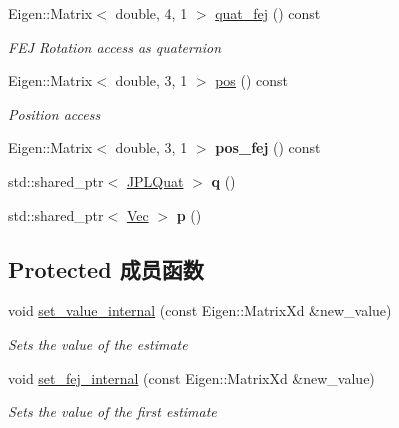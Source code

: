 \begin{DoxyCompactItemize}
\mbox{\label{classov__type_1_1PoseJPL_aa1bb71fdf85190373629e8a2ac818205}} 
Eigen\+::\+Matrix$<$ double, 4, 1 $>$ \hyperlink{classov__type_1_1PoseJPL_aa1bb71fdf85190373629e8a2ac818205}{quat\+\_\+fej} () const
\begin{DoxyCompactList}\small\item\em F\+EJ Rotation access as quaternion \end{DoxyCompactList}\item 
\mbox{\label{classov__type_1_1PoseJPL_ae1f0b41d18b5307e9d035d05abf91c68}} 
Eigen\+::\+Matrix$<$ double, 3, 1 $>$ \hyperlink{classov__type_1_1PoseJPL_ae1f0b41d18b5307e9d035d05abf91c68}{pos} () const
\begin{DoxyCompactList}\small\item\em Position access \end{DoxyCompactList}\item 
\mbox{\label{classov__type_1_1PoseJPL_a6cdf8ee3cfefe564eb01e4b9367a04f6}} 
Eigen\+::\+Matrix$<$ double, 3, 1 $>$ {\bfseries pos\+\_\+fej} () const
\item 
\mbox{\label{classov__type_1_1PoseJPL_a2e6896246cfdba377cd75444f44a8868}} 
std\+::shared\+\_\+ptr$<$ \hyperlink{classov__type_1_1JPLQuat}{J\+P\+L\+Quat} $>$ {\bfseries q} ()
\item 
\mbox{\label{classov__type_1_1PoseJPL_a428675563a664d2f1e3adf333762a022}} 
std\+::shared\+\_\+ptr$<$ \hyperlink{classov__type_1_1Vec}{Vec} $>$ {\bfseries p} ()
\end{DoxyCompactItemize}
\subsection*{Protected 成员函数}
\begin{DoxyCompactItemize}
\item 
void \hyperlink{classov__type_1_1PoseJPL_ab1a626a94a9c7013a253dd16a2b6a0cc}{set\+\_\+value\+\_\+internal} (const Eigen\+::\+Matrix\+Xd \&new\+\_\+value)
\begin{DoxyCompactList}\small\item\em Sets the value of the estimate \end{DoxyCompactList}\item 
void \hyperlink{classov__type_1_1PoseJPL_a779b5bce92981b57b018ab5c14cf4b99}{set\+\_\+fej\+\_\+internal} (const Eigen\+::\+Matrix\+Xd \&new\+\_\+value)
\begin{DoxyCompactList}\small\item\em Sets the value of the first estimate \end{DoxyCompactList}\end{DoxyCompactItemize}
